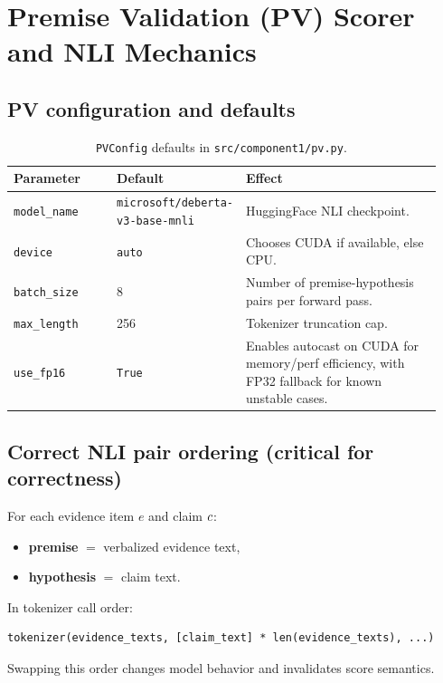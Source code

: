 \section{Premise Validation (PV) Scorer and NLI Mechanics}
\label{sec:c1_pv}

\subsection{PV configuration and defaults}
\begin{table}[H]
\centering
\begin{tabular}{@{}p{0.25\linewidth}p{0.19\linewidth}p{0.50\linewidth}@{}}
\toprule
Parameter & Default & Effect \\
\midrule
\texttt{model\_name} & \texttt{microsoft/deberta-v3-base-mnli} & HuggingFace NLI checkpoint. \\
\texttt{device} & \texttt{auto} & Chooses CUDA if available, else CPU. \\
\texttt{batch\_size} & 8 & Number of premise-hypothesis pairs per forward pass. \\
\texttt{max\_length} & 256 & Tokenizer truncation cap. \\
\texttt{use\_fp16} & \texttt{True} & Enables autocast on CUDA for memory/perf efficiency, with FP32 fallback for known unstable cases. \\
\bottomrule
\end{tabular}
\caption{\texttt{PVConfig} defaults in \texttt{src/component1/pv.py}.}
\label{tab:c1_pv_defaults}
\end{table}

\subsection{Correct NLI pair ordering (critical for correctness)}
For each evidence item $e$ and claim $c$:
\begin{itemize}
\item \textbf{premise} $=$ verbalized evidence text,
\item \textbf{hypothesis} $=$ claim text.
\end{itemize}
In tokenizer call order:
\begin{lstlisting}[style=jsonstyle]
tokenizer(evidence_texts, [claim_text] * len(evidence_texts), ...)
\end{lstlisting}
Swapping this order changes model behavior and invalidates score semantics.

